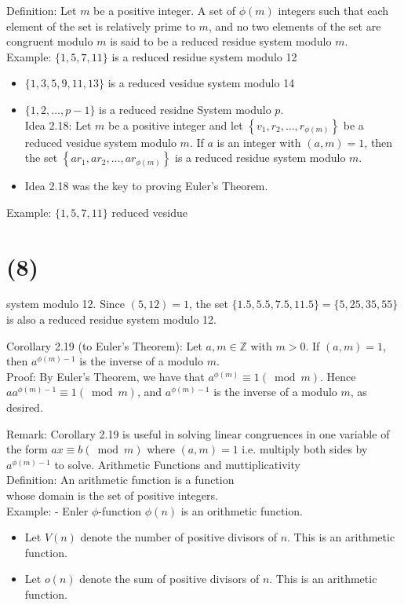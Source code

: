 \documentclass[10pt]{article}
\begin{document}
Definition: Let $m$ be a positive integer. A set of $\phi(m)$ integers such that each element of the set is relatively prime to $m$, and no two elements of the set are congruent modulo $m$ is said to be a reduced residue system modulo $m$.\\
Example: $\{1,5,7,11\}$ is a reduced residue system modulo 12

\begin{itemize}
  \item $\{1,3,5,9,11,13\}$ is a reduced vesidue system modulo 14
  \item $\{1,2, \ldots, p-1\}$ is a reduced residne System modulo $p$.\\
Idea 2.18: Let $m$ be a positive integer and let $\left\{v_{1}, r_{2}, \ldots, r_{\phi(m)}\right\}$ be a reduced vesidue system modulo $m$. If $a$ is an integer with $(a, m)=1$, then the set $\left\{a r_{1}, a r_{2}, \ldots, a r_{\phi(m)}\right\}$ is a reduced residue system modulo $m$.
  \item Idea 2.18 was the key to proving Euler's Theorem.
\end{itemize}

Example: $\{1,5,7,11\}$ reduced vesidue

\section*{(8)}
system modulo 12. Since $(5,12)=1$, the set $\{1.5,5.5,7.5,11.5\}=\{5,25,35,55\}$ is also a reduced residue system modulo 12.

Corollary 2.19 (to Euler's Theorem): Let $a, m \in \mathbb{Z}$ with $m>0$. If $(a, m)=1$, then $a^{\phi(m)-1}$ is the inverse of a modulo $m$.\\
Proof: By Euler's Theorem, we have that $a^{\phi(m)} \equiv 1(\bmod m)$. Hence $a a^{\phi(m)-1} \equiv 1(\bmod m)$, and $a^{\phi(m)-1}$ is the inverse of a modulo $m$, as desired.

Remark: Corollary 2.19 is useful in solving linear congruences in one variable of the form $a x \equiv b(\bmod m)$ where $(a, m)=1$ i.e. multiply both sides by $a^{\phi(m)-1}$ to solve. Arithmetic Functions and muttiplicativity\\
Definition: An arithmetic function is a function\\
whose domain is the set of positive integers.\\
Example: - Enler $\phi$-function $\phi(n)$ is an orithmetic function.

\begin{itemize}
  \item Let $V(n)$ denote the number of positive divisors of $n$. This is an arithmetic function.
  \item Let $o(n)$ denote the sum of positive divisors of $n$. This is an arithmetic function.
\end{itemize}
\end{document}
